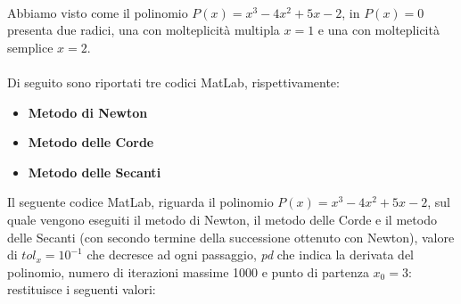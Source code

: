 \large\noindent{}\\

Abbiamo visto come il polinomio $P(x) = x^3-4x^2+5x-2$, in $P(x)=0$ presenta due radici, una con molteplicità multipla $x=1$ e una con molteplicità semplice $x=2$.\\\\
Di seguito sono riportati tre codici MatLab, rispettivamente:
\begin{itemize}
	\item \textbf{Metodo di Newton}
		
	\item \textbf{Metodo delle Corde}
		
	\item \textbf{Metodo delle Secanti}
		
\end{itemize}
Il seguente codice MatLab, riguarda il polinomio $P(x) = x^3-4x^2+5x-2$, sul quale vengono eseguiti il metodo di Newton, il metodo delle Corde e il metodo delle Secanti (con secondo termine della successione ottenuto con Newton), valore di $tol_x=10^{-1}$ che decresce ad ogni passaggio, \textit{pd} che indica la derivata del polinomio, numero di iterazioni massime 1000 e punto di partenza $x_{0}=3$:\\
	
restituisce i seguenti valori:\\
